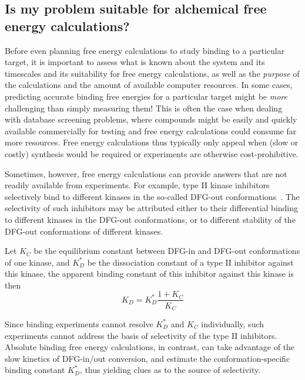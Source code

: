 \documentclass[9pt,bestpractices,pubversion]{livecoms}
\begin{document}
\subsection{Is my problem suitable for alchemical free energy calculations?}
\label{subsec:suitability}
Before even planning free energy calculations to study binding to a
particular target, it is important to assess what is known about the
system and its timescales and its suitability for free energy
calculations, as well as the \emph{purpose} of the calculations and
the amount of available computer resources. In some cases, predicting accurate binding free energies for a particular target might be
\emph{more} challenging than simply measuring them! This is
often the case when dealing with database screening problems, where
compounds might be easily and quickly available commercially for
testing and free energy calculations could consume far more resources. Free energy calculations thus typically only
appeal when (slow or costly) synthesis would be required or experiments are otherwise cost-prohibitive.

Sometimes, however, free energy calculations can provide answers that are not
readily available from experiments. For example, type II kinase
inhibitors selectively bind to different kinases in the so-called
DFG-out conformations~\cite{schindler2000structural}. The selectivity of such
inhibitors may be attributed either to their differential binding to
different kinases in the DFG-out conformations, or to different
stability of the DFG-out conformations of different kinases. 

Let
$K_C$ be the equilibrium constant between DFG-in and DFG-out
conformations of one kinase, and $K_D^\ast$ be the dissociation
constant of a type II inhibitor against this kinase, the apparent
binding constant of this inhibitor against this kinase is then
\begin{equation}
  K_D = K_D^\ast \frac{1 + K_C}{K_C}
  \label{eqn:conformational-binding}
\end{equation}

Since binding experiments cannot resolve $K_D^\ast$ and $K_C$ individually, such experiments cannot address the basis of selectivity of the type II inhibitors. Absolute binding free energy calculations, in contrast, can take advantage of the slow kinetics of DFG-in/out conversion, and estimate the conformation-specific binding constant $K_D^\ast$, thus yielding clues as to the source of selectivity.

%
%
\end{document}
